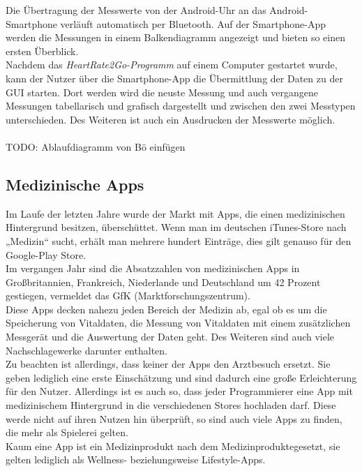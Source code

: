 Die Übertragung der Messwerte von der Android-Uhr an das Android-Smartphone verläuft automatisch per Bluetooth. Auf der Smartphone-App werden die Messungen in einem Balkendiagramm angezeigt und bieten so einen ersten Überblick. \\
Nachdem das \textit{HeartRate2Go-Programm} auf einem Computer gestartet wurde, kann der Nutzer über die Smartphone-App die Übermittlung der Daten zu der GUI starten. Dort werden wird die neuste Messung und auch vergangene Messungen tabellarisch und grafisch dargestellt und zwischen den zwei Messtypen unterschieden. Des Weiteren ist auch ein Ausdrucken der Messwerte möglich.\\
\\
TODO: Ablaufdiagramm von Bö einfügen
\\  
\subsection{Medizinische Apps}\label{sec:Medizinische Apps}
Im Laufe der letzten Jahre wurde der Markt mit Apps, die einen medizinischen Hintergrund besitzen, überschüttet. Wenn man im deutschen iTunes-Store nach „Medizin“ sucht, erhält man mehrere hundert Einträge, dies gilt genauso für den Google-Play Store. \\
Im vergangen Jahr sind die Absatzzahlen von medizinischen Apps in Großbritannien, Frankreich, Niederlande und Deutschland um 42 Prozent gestiegen, vermeldet das GfK (Marktforschungszentrum).\\
Diese Apps decken nahezu jeden Bereich der Medizin ab, egal ob es um die Speicherung von Vitaldaten, die Messung von Vitaldaten mit einem zusätzlichen Messgerät und die Auswertung der Daten geht. Des Weiteren sind auch viele Nachschlagewerke darunter enthalten.\\
Zu beachten ist allerdings, dass keiner der Apps den Arztbesuch ersetzt. Sie geben lediglich eine erste Einschätzung und sind dadurch eine große Erleichterung für den Nutzer. Allerdings ist es auch so, dass jeder Programmierer eine App mit medizinischem Hintergrund in die verschiedenen Stores hochladen darf. Diese werde nicht auf ihren Nutzen hin überprüft, so sind auch viele Apps zu finden, die mehr als Spielerei gelten.\\
Kaum eine App ist ein Medizinprodukt nach dem Medizinproduktegesetzt, sie gelten lediglich als Wellness- beziehungsweise Lifestyle-Apps. \\
\\

\textbf{} 

